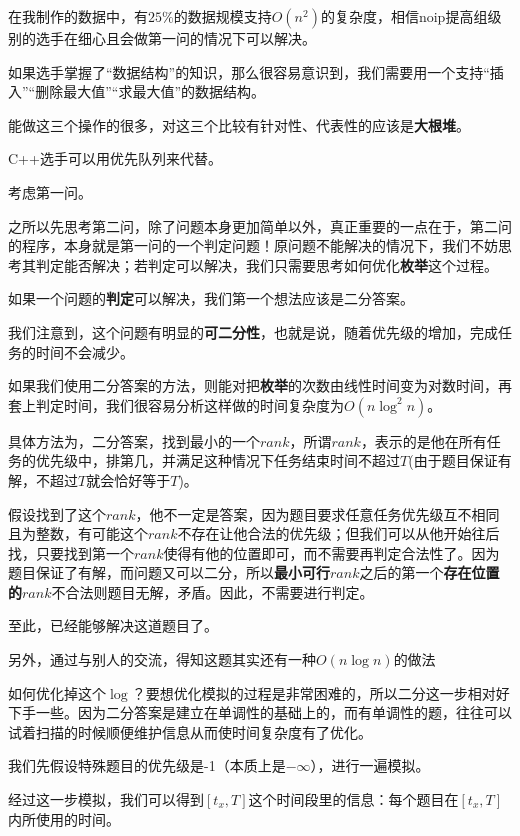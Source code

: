 \documentclass{ctexart}
\begin{document}
			在我制作的数据中，有$25\%$的数据规模支持$O(n^2)$的复杂度，相信noip提高组级别的选手在细心且会做第一问的情况下可以解决。

			如果选手掌握了``数据结构''的知识，那么很容易意识到，我们需要用一个支持``插入''``删除最大值''``求最大值''的数据结构。

			能做这三个操作的很多，对这三个比较有针对性、代表性的应该是{\textbf{大根堆}}。

			C++选手可以用优先队列来代替。

			考虑第一问。

			之所以先思考第二问，除了问题本身更加简单以外，真正重要的一点在于，第二问的程序，本身就是第一问的一个判定问题！原问题不能解决的情况下，我们不妨思考其判定能否解决；若判定可以解决，我们只需要思考如何优化{\textbf{枚举}}这个过程。

			如果一个问题的{\textbf{判定}}可以解决，我们第一个想法应该是二分答案。

			我们注意到，这个问题有明显的{\textbf{可二分性}}，也就是说，随着优先级的增加，完成任务的时间不会减少。

			如果我们使用二分答案的方法，则能对把{\textbf{枚举}}的次数由线性时间变为对数时间，再套上判定时间，我们很容易分析这样做的时间复杂度为$O(n \log^2 n)$。

			具体方法为，二分答案，找到最小的一个$rank$，所谓$rank$，表示的是他在所有任务的优先级中，排第几，并满足这种情况下任务结束时间不超过$T$(由于题目保证有解，不超过$T$就会恰好等于$T$)。

			假设找到了这个$rank$，他不一定是答案，因为题目要求任意任务优先级互不相同且为整数，有可能这个$rank$不存在让他合法的优先级；但我们可以从他开始往后找，只要找到第一个$rank$使得有他的位置即可，而不需要再判定合法性了。因为题目保证了有解，而问题又可以二分，所以{\textbf{最小可行$rank$}}之后的第一个{\textbf{存在位置的$rank$}}不合法则题目无解，矛盾。因此，不需要进行判定。

			至此，已经能够解决这道题目了。

			另外，通过与别人的交流，得知这题其实还有一种$O(n \log n)$的做法

			如何优化掉这个$\log$？要想优化模拟的过程是非常困难的，所以二分这一步相对好下手一些。因为二分答案是建立在单调性的基础上的，而有单调性的题，往往可以试着扫描的时候顺便维护信息从而使时间复杂度有了优化。

			我们先假设特殊题目的优先级是-1（本质上是$-\infty$），进行一遍模拟。

			经过这一步模拟，我们可以得到$[t_x,T]$这个时间段里的信息：每个题目在$[t_x,T]$内所使用的时间。
\end{document}
